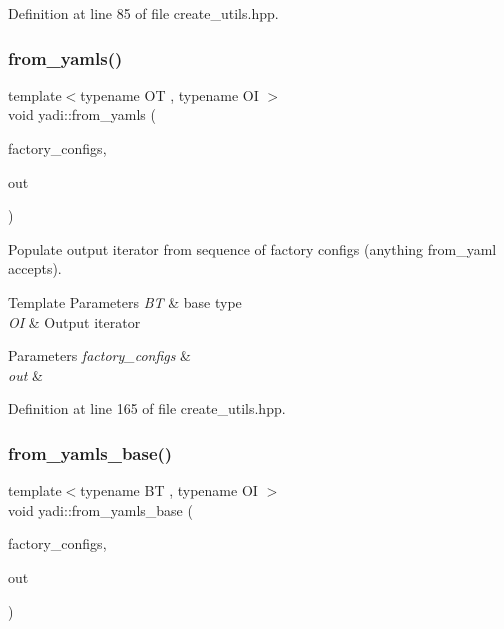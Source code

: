 Definition at line 85 of file create\+\_\+utils.\+hpp.

\mbox{\label{namespaceyadi_a5c72b55cccde908a9828431855e3b5e5}} 
\subsubsection{\texorpdfstring{from\+\_\+yamls()}{from\_yamls()}}
{\footnotesize\ttfamily template$<$typename OT , typename OI $>$ \\
void yadi\+::from\+\_\+yamls (\begin{DoxyParamCaption}\item[{Y\+A\+M\+L\+::\+Node const \&}]{factory\+\_\+configs,  }\item[{OI}]{out }\end{DoxyParamCaption})}



Populate output iterator from sequence of factory configs (anything from\+\_\+yaml accepts). 


\begin{DoxyTemplParams}{Template Parameters}
{\em BT} & base type \\
\hline
{\em OI} & Output iterator \\
\hline
\end{DoxyTemplParams}

\begin{DoxyParams}{Parameters}
{\em factory\+\_\+configs} & \\
\hline
{\em out} & \\
\hline
\end{DoxyParams}


Definition at line 165 of file create\+\_\+utils.\+hpp.

\mbox{\label{namespaceyadi_a425268f5a35df74d449b5e1f44f39c22}} 
\subsubsection{\texorpdfstring{from\+\_\+yamls\+\_\+base()}{from\_yamls\_base()}}
{\footnotesize\ttfamily template$<$typename BT , typename OI $>$ \\
void yadi\+::from\+\_\+yamls\+\_\+base (\begin{DoxyParamCaption}\item[{Y\+A\+M\+L\+::\+Node const \&}]{factory\+\_\+configs,  }\item[{OI}]{out }\end{DoxyParamCaption})}



